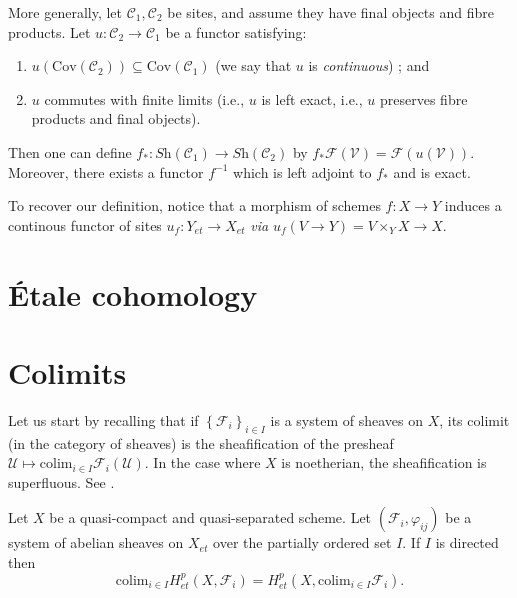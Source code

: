 \begin{remark}
\label{remark-functoriality-general}
More generally, let $\mathcal{C}_1, \mathcal{C}_2$ be sites, and
assume they have final objects and fibre products. Let
$u: \mathcal{C}_2 \to \mathcal{C}_1$ be a functor satisfying:
\begin{enumerate}
\item $u (\text{Cov}(\mathcal{C}_2)) \subseteq \text{Cov}(\mathcal{C}_1)$ (we
say that $u$ is {\it continuous}) ; and
\item $u$ commutes with finite limits (i.e., $u$ is left exact, i.e.,
$u$ preserves fibre products and final objects).
\end{enumerate}
Then one can define $f_*: \textit{Sh}(\mathcal{C}_1) \to
\textit{Sh}(\mathcal{C}_2)$ by $ f_* \mathcal{F}(\mathcal{V}) =
\mathcal{F}(u(\mathcal{V}))$. Moreover, there exists a functor $f^{-1}$ which
is left adjoint to $f_*$ and is exact.

\medskip\noindent
To recover our definition, notice that a morphism of schemes $ f: X \to Y$
induces a continous functor of sites $u_f: Y_{et} \to X_{et}$ {\it via} $u_f (V
\to Y) = V \times_Y X \to X$.
\end{remark}






\section{\'Etale cohomology}
\label{section-etale-cohomology}


\section{Colimits}
\label{section-colimit}

\noindent
Let us start by recalling that if $\left\{\mathcal{F}_i\right\}_{i\in I}$ is a
system of sheaves on $X$, its colimit (in the category of sheaves) is the
sheafification of the presheaf $\mathcal{U} \mapsto \text{colim}_{i\in I}
\mathcal{F}_i(\mathcal{U})$. In the case where $X$ is noetherian, the
sheafification is superfluous. See \cite{H}.

\begin{theorem}
\label{theorem-colimit}
Let $X$ be a quasi-compact and quasi-separated scheme. Let
$\left(\mathcal{F}_i, \varphi_{ij}\right)$ be a system of abelian sheaves on
$X_{et}$ over the partially ordered set $I$. If $I$ is directed then
$$
\text{colim}_{i\in I} H_{et}^p(X, \mathcal{F}_i) = H_{et}^p(X,
\text{colim}_{i\in I} \mathcal{F}_i).
$$
\end{theorem}

